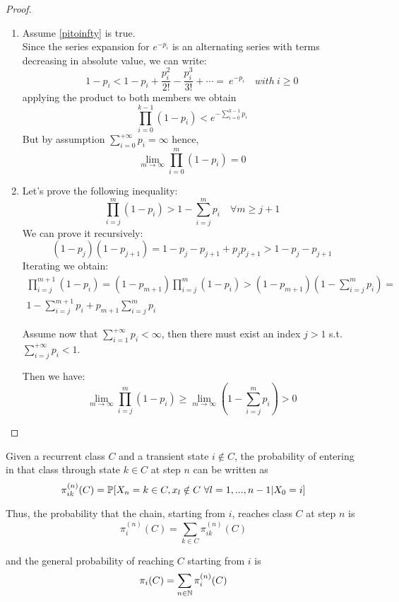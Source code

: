 	\begin{proof}
		\begin{enumerate}
			\item Assume \eqref{pitoinfty} is true. \\
				Since the series expansion for $e^{-p_i}$ is an alternating series with terms decreasing in absolute value, we can write:
				\begin{equation}
					1-p_i < 1-p_i + \frac{p_i^2}{2!} - \frac{p_i^3}{3!} + \cdots = ~e^{-p_i} \quad with ~i\ge 0
				\end{equation}
				applying the product to both members we obtain
				\begin{equation}
					\prod_{i=0}^{k-1} (1-p_i) < e^{-\sum\limits_{i=0}^{k-1}p_i}
				\end{equation}
				But by assumption $\sum\limits_{i=0}^{+\infty} p_i = \infty$ hence,
				$$ \lim_{m \to \infty} \prod_{i=0}^{m}(1-p_i) = 0 $$

			\item Let's prove the following inequality:
			$$ \prod_{i=j}^m(1-p_i) > 1-\sum\limits_{i=j}^m p_i \quad \forall m \ge j+1$$
			We can prove it recursively:
			$$(1-p_j)(1-p_{j+1}) = 1-p_j - p_{j+1} + p_j p_{j+1} > 1-p_j - p_{j+1}$$
			Iterating we obtain:
			\begin{eqnarray*}
				\prod_{i=j}^{m+1}(1-p_i) = (1-p_{m+1})\prod_{i=j}^m(1-p_i) > (1-p_{m+1})(1-\sum\limits_{i=j}^m p_i) = \\
				1- \sum\limits_{i=j}^{m+1} p_i + p_{m+1}\sum\limits_{i=j}^m p_i
			\end{eqnarray*}

			Assume now that $\sum\limits_{i=1}^{+\infty} p_i < \infty$, then there must exist an index $j>1$ s.t. $\sum\limits_{i=j}^{+\infty} p_i < 1$.

			Then we have:
			$$ \lim_{m \to \infty} \prod_{i=j}^m (1-p_i) \ge \lim_{m \to \infty} (1-\sum\limits_{i=j}^m p_i) > 0 $$
		\end{enumerate}
	\end{proof}

	\begin{definition}[lesson 22/03/17] \label{def:falling_probability}
		Given a recurrent class $C$ and a transient state $i \notin C$, the probability of entering in that class through state $k \in C$ at step $n$ can be written as
		$$ \pi_{ik}^{(n)}(C) = \mathbb{P}[X_n = k \in C, x_l \notin C ~ \forall l=1, ..., n-1 | X_0 = i] $$

		Thus, the probability that the chain, starting from $i$, reaches class $C$ at step $n$ is
		$$ \pi_{i}^{(n)}(C) = \sum_{k \in C} \pi_{ik}^{(n)}(C) $$

		and the general probability of reaching $C$ starting from $i$ is
		$$ \pi_i(C) = \sum_{n \in \mathbb{N}} \pi_i^{(n)}(C) $$
	\end{definition}


